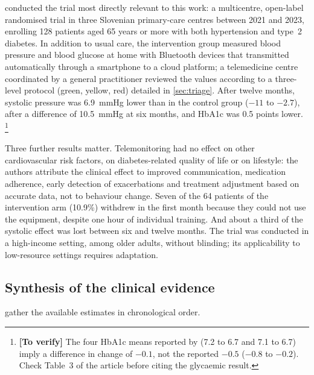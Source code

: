 \documentclass[12pt,a4paper,oneside]{report}
\newcommand{\verify}[1]{\footnote{\textbf{[To verify]} #1}}
\begin{document}
\Textcite{mihevc2025} conducted the trial most directly relevant to this work: a multicentre, open-label randomised trial in three Slovenian primary-care centres between 2021 and 2023, enrolling 128 patients aged 65 years or more with both hypertension and type~2 diabetes. In addition to usual care, the intervention group measured blood pressure and blood glucose at home with Bluetooth devices that transmitted automatically through a smartphone to a cloud platform; a telemedicine centre coordinated by a general practitioner reviewed the values according to a three-level protocol (green, yellow, red) detailed in \cref{sec:triage}. After twelve months, systolic pressure was 6.9~mmHg lower than in the control group ($-11$ to $-2.7$), after a difference of 10.5~mmHg at six months, and HbA1c was 0.5 points lower.%
\verify{The four HbA1c means reported by \textcite{mihevc2025} (7.2 to 6.7 and 7.1 to 6.7) imply a difference in change of $-0.1$, not the reported $-0.5$ ($-0.8$ to $-0.2$). Check Table~3 of the article before citing the glycaemic result.}

Three further results matter. Telemonitoring had no effect on other cardiovascular risk factors, on diabetes-related quality of life or on lifestyle: the authors attribute the clinical effect to improved communication, medication adherence, early detection of exacerbations and treatment adjustment based on accurate data, not to behaviour change. Seven of the 64 patients of the intervention arm (10.9\%) withdrew in the first month because they could not use the equipment, despite one hour of individual training. And about a third of the systolic effect was lost between six and twelve months. The trial was conducted in a high-income setting, among older adults, without blinding; its applicability to low-resource settings requires adaptation.

\subsection{Synthesis of the clinical evidence}\label{sec:consolidated}

 gather the available estimates in chronological order.
\end{document}
